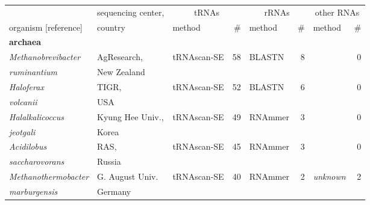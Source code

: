 \begin{footnotesize}
\begin{center}
\begin{table}
\label{tbl:genomes}       
\begin{tabular}{|ll|lr|lr|lr|}
\hline
                                         & sequencing center,&\multicolumn{2}{c|}{tRNAs}&\multicolumn{2}{c|}{rRNAs}& \multicolumn{2}{c|}{other RNAs} \\ \cline{3-8}
organism [reference]                     & country           & method        & \#       & method         & \# & method & \# \\ \hline
\multicolumn{8}{l}{\textbf{archaea}} \\ \hline
\emph{Methanobrevibacter}                & AgResearch,       & tRNAscan-SE   & 58       & BLASTN         & 8  &                & 0        \\
\emph{ruminantium}                       & New Zealand       &               &          &                &    &                &          \\ \hline
\emph{Haloferax}                         & TIGR,             & tRNAscan-SE   & 52       & BLASTN         & 6  &                & 0        \\
\emph{volcanii}                          & USA               &               &          &                &    &                &          \\  \hline %
\emph{Halalkalicoccus}                   & Kyung Hee Univ.,  & tRNAscan-SE   & 49       & RNAmmer        & 3  &                & 0        \\
\emph{jeotgali}                          & Korea             &               &          &                &    &                &          \\ \hline
\emph{Acidilobus}                        & RAS,              & tRNAscan-SE   & 45       & RNAmmer        & 3  &                & 0        \\
\emph{saccharovorans}                    & Russia            &               &          &                &    &                &          \\ \hline
\emph{Methanothermobacter}               & G. August Univ.   & tRNAscan-SE   & 40       & RNAmmer        & 2  & \emph{unknown} &  2       \\
\emph{marburgensis}                      & Germany           &               &          &                &    &                &          \\ \hline %

\end{tabular}
\end{table}
\end{center}
\end{footnotesize}
